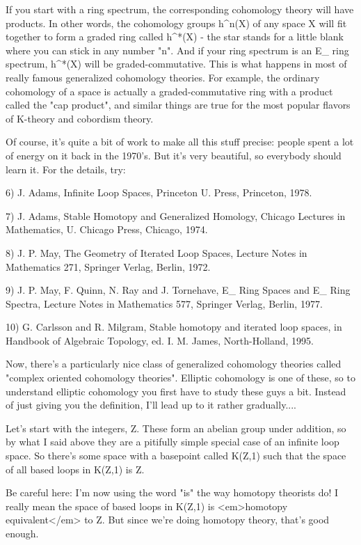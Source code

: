 If you start with a ring spectrum, the corresponding cohomology theory
will have products.  In other words, the cohomology groups h^{n}(X)
of any space X will fit together to form a graded ring called h^{*}(X)
- the star stands for a little blank where you can stick in any number 
"n".  
And if your ring spectrum is an E_{\infty } ring spectrum, h^{*}(X) 
will be graded-commutative.  This is what happens in most of really famous 
generalized cohomology theories.  For example, the ordinary cohomology 
of a space is actually a graded-commutative ring with a product called
the "cap product", and similar things are true for the most popular 
flavors of K-theory and cobordism theory.

Of course, it's quite a bit of work to make all this stuff precise:
people spent a lot of energy on it back in the 1970's.  But it's very
beautiful, so everybody should learn it.  For the details, try:

6) J. Adams, Infinite Loop Spaces, Princeton U. Press, Princeton, 1978.

7) J. Adams, Stable Homotopy and Generalized Homology, Chicago Lectures
in Mathematics, U. Chicago Press, Chicago, 1974.

8) J. P. May, The Geometry of Iterated Loop Spaces, Lecture Notes in
Mathematics 271, Springer Verlag, Berlin, 1972.

9) J. P. May, F. Quinn, N. Ray and J. Tornehave, E_{\infty } Ring Spaces
and E_{\infty } Ring Spectra, Lecture Notes in Mathematics 577, Springer
Verlag, Berlin, 1977.

10) G. Carlsson and R. Milgram, Stable homotopy and iterated loop spaces,
in Handbook of Algebraic Topology, ed. I. M. James, North-Holland, 1995.

Now, there's a particularly nice class of generalized cohomology
theories called "complex oriented cohomology theories".   Elliptic
cohomology is one of these, so to understand elliptic cohomology you
first have to study these guys a bit.  Instead of just giving you 
the definition, I'll lead up to it rather gradually....

Let's start with the integers, Z.  These form an abelian group under
addition, so by what I said above they are a pitifully simple special
case of an infinite loop space.  So there's some space with a basepoint 
called K(Z,1) such that the space of all based loops in K(Z,1) is Z.  

Be careful here: 
I'm now using the word "is" the way homotopy theorists 
do!  I really mean the space of based loops in K(Z,1) is <em>homotopy 
equivalent</em> to Z.  But since we're doing homotopy theory, that's good 
enough.   

